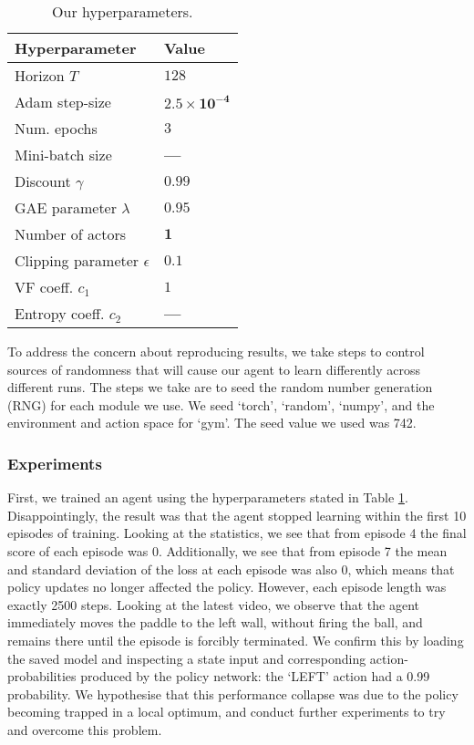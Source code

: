 \documentclass[12pt,a4paper]{article}
\begin{document}
\begin{table}[ht]
\begin{subtable}[ht]{0.45\textwidth}
    \end{subtable}
    \hfill
    \begin{subtable}[ht]{0.45\textwidth}
        \centering
        \caption{Our hyperparameters.}
        \label{tab:our-param}
        \begin{tabular}{ l|l } 
            Hyperparameter                & Value \\
            \hline 
            Horizon $T$                   & $128$ \\ 
            Adam step-size                 & $\mathbf{2.5 \times 10^{-4}}$ \\
            Num. epochs                   & $3$ \\
            Mini-batch size                & \textbf{---} \\
            Discount $\gamma$           & $0.99$ \\
            GAE parameter $\lambda$     & $0.95$ \\
            Number of actors              & $\mathbf{1}$ \\
            Clipping parameter $\epsilon$ & $\mathbf{0.1}$ \\
            VF coeff. $c_1$               & $1$ \\
            Entropy coeff. $c_2$          & \textbf{---}
        \end{tabular}
     \end{subtable}
\end{table}

To address the concern about reproducing results, we take steps to control sources of randomness that will cause our agent to learn differently across different runs. The steps we take are to seed the random number generation (RNG) for each module we use. We seed `torch', `random', `numpy', and the environment and action space for `gym'. The seed value we used was 742.

\subsubsection{Experiments}
First, we trained an agent using the hyperparameters stated in Table \ref{tab:our-param}. Disappointingly, the result was that the agent stopped learning within the first 10 episodes of training. Looking at the statistics, we see that from episode 4 the final score of each episode was 0. Additionally, we see that from episode 7 the mean and standard deviation of the loss at each episode was also 0, which means that policy updates no longer affected the policy. However, each episode length was exactly 2500 steps. Looking at the latest video, we observe that the agent immediately moves the paddle to the left wall, without firing the ball, and remains there until the episode is forcibly terminated. We confirm this by loading the saved model and inspecting a state input and corresponding action-probabilities produced by the policy network: the `LEFT' action had a 0.99 probability. We hypothesise that this performance collapse was due to the policy becoming trapped in a local optimum, and conduct further experiments to try and overcome this problem. 
\end{document}
